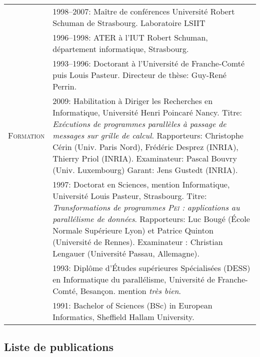 \begin{tabular}{lp{13.7cm}}
				& 1998--2007: Maître de conférences Université Robert Schuman de Strasbourg. Laboratoire LSIIT\\[2mm]
				& 1996--1998: ATER à l'IUT Robert Schuman, département informatique, Strasbourg.\\[2mm]
				& 1993--1996: Doctorant à l'Université de Franche-Comté puis Louis Pasteur. Directeur de thèse: Guy-René Perrin.\\[2mm]
\hline
\textsc{Formation}	& 2009:  Habilitation à Diriger les Recherches en Informatique, Université Henri Poincaré Nancy.
      			  Titre: {\em Exécutions de programmes parallèles à passage de messages sur grille de calcul.}
   				 Rapporteurs: 	Christophe Cérin (Univ. Paris Nord), 
				   		   	Frédéric Desprez (INRIA),
							Thierry Priol (INRIA). 
							Examinateur: Pascal Bouvry (Univ. Luxembourg)
							Garant: Jens Gustedt (INRIA).\\[5mm]
%
				& 1997:  Doctorat en Sciences, mention Informatique, Université Louis Pasteur, Strasbourg.
      			  Titre: {\em Transformations de programmes \textsc{Pei} : applications au parall\'{e}lisme de donn\'{e}es}.
		              Rapporteurs: Luc Bougé (\'{E}cole Normale Supérieure Lyon) et Patrice Quinton (Université de Rennes). Examinateur : Christian Lengauer (Université Passau, Allemagne).\\[2mm]
			      & 1993: Diplôme d'\'{E}tudes supérieures Spécialisées (DESS) en Informatique du parallélisme, 
				  Université de Franche-Comté, Besançon. mention {\em très bien}.\\[2mm]
				& 1991: Bachelor of Sciences (BSc) in European Informatics, Sheffield Hallam University.\\[5mm]

\end{tabular}



\newpage
\subsection{Liste de publications}


